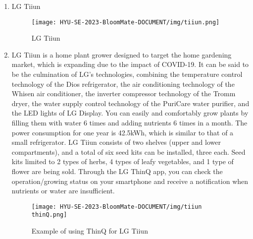 \documentclass[conference, a4paper]{IEEEtran}
\begin{document}
\begin{enumerate}
\item LG Tiiun
\begin{figure}[h]
\texttt{[image: HYU-SE-2023-BloomMate-DOCUMENT/img/tiiun.png]}
\label{fig:tiiun}
\caption{LG Tiiun} 
\end{figure}
\item[] LG Tiiun is a home plant grower designed to target the home gardening market, which is expanding due to the impact of COVID-19. It can be said to be the culmination of LG's technologies, combining the temperature control technology of the Dios refrigerator, the air conditioning technology of the Whisen air conditioner, the inverter compressor technology of the Tromm dryer, the water supply control technology of the PuriCare water purifier, and the LED lights of LG Display. You can easily and comfortably grow plants by filling them with water 6 times and adding nutrients 6 times in a month. The power consumption for one year is 42.5kWh, which is similar to that of a small refrigerator. LG Tiiun consists of two shelves (upper and lower compartments), and a total of six seed kits can be installed, three each. Seed kits limited to 2 types of herbs, 4 types of leafy vegetables, and 1 type of flower are being sold. Through the LG ThinQ app, you can check the operation/growing status on your smartphone and receive a notification when nutrients or water are insufficient. \\
\begin{figure}[h]
\texttt{[image: HYU-SE-2023-BloomMate-DOCUMENT/img/tiiun thinQ.png]}
\label{fig:tiiunThinQ}
\caption{Example of using ThinQ for LG Tiiun} 
\end{figure}
\end{enumerate}
\end{document}

